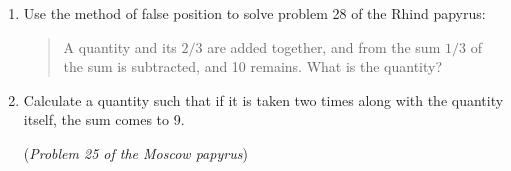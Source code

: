 \begin{exercises*}{}{}
\begin{enumerate}
	  \item%
	  Use the method of false position to solve problem 28 of the Rhind papyrus:
	  \begin{quote}
	  	A quantity and its $2/3$ are added together, and from the sum $1/3$ of the sum is subtracted, and 10 remains. What is the quantity?
	  \end{quote}
	  
	  \item %
	  Calculate a quantity such that if it is taken two times along with the quantity itself, the sum comes to 9.\par
	  (\emph{Problem 25 of the Moscow papyrus})
	\end{enumerate}
\end{exercises*}

